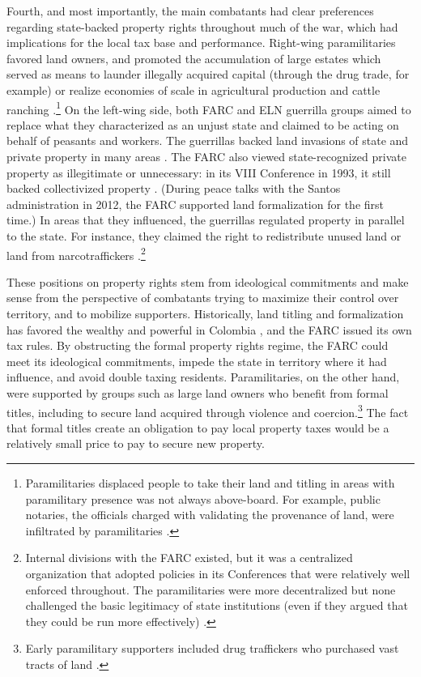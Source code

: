 Fourth, and most importantly, the main combatants had clear preferences regarding state-backed property rights throughout much of the war, which had implications for the local tax base and performance. Right-wing paramilitaries favored land owners, and promoted the accumulation of large estates which served as means to launder illegally acquired capital (through the drug trade, for example) or realize economies of scale in agricultural production and cattle ranching \citep{reyes07a}.\footnote{Paramilitaries displaced people to take their land and titling in areas with paramilitary presence was not always above-board. For example, public notaries, the officials charged with validating the provenance of land, were infiltrated by paramilitaries \citep[e.g.,][]{duran12a, verdad-abierta12a}.} 
On the left-wing side, both FARC and ELN guerrilla groups aimed to replace what they characterized as an unjust state and claimed to be acting on behalf of peasants and workers. The guerrillas backed land invasions of state and private property in many areas \citep[e.g.,][]{steele17a}. The FARC also viewed state-recognized private property as illegitimate or unnecessary: in its VIII Conference in 1993, it still backed collectivized property \citep{bernal-morales14a}. (During peace talks with the Santos administration in 2012, the FARC supported land formalization for the first time.) In areas that they influenced, the guerrillas regulated property in parallel to the state. For instance, they claimed the right to redistribute unused land or land from narcotraffickers \citep{bernal-morales14a}.\footnote{Internal divisions with the FARC existed, but it was a centralized organization that adopted policies in its Conferences that were relatively well enforced throughout. The paramilitaries were more decentralized but none challenged the basic legitimacy of state institutions (even if they argued that they could be run more effectively) \citep{gutierrez-sanin08a,romero03a}.} 

These positions on property rights stem from ideological commitments and make sense from the perspective of combatants trying to maximize their control over territory, and to mobilize supporters. Historically, land titling and formalization has favored the wealthy and powerful in Colombia \citep{albertuskaplan13a, flores14a}, and the FARC issued its own tax rules. By obstructing the formal property rights regime, the FARC could meet its ideological commitments, impede the state in territory where it had influence, and avoid double taxing residents. Paramilitaries, on the other hand, were supported by groups such as large land owners who benefit from formal titles, including to secure land acquired through violence and coercion.\footnote{Early paramilitary supporters included drug traffickers who purchased vast tracts of land \citep{romero00a, ronderos14a}.} The fact that formal titles create an obligation to pay local property taxes would be a relatively small price to pay to secure new property.

